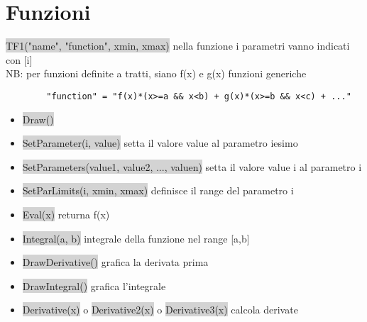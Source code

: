 \documentclass[a4paper]{article}
\begin{document}
\section{Funzioni}
    \colorbox{LightGray}{TF1("name", "function", xmin, xmax)} nella funzione i parametri vanno indicati con [i]\\
    NB: per funzioni definite a tratti, siano f(x) e g(x) funzioni generiche
    \begin{verbatim}
        "function" = "f(x)*(x>=a && x<b) + g(x)*(x>=b && x<c) + ..."
    \end{verbatim}
    \begin{itemize}
        \item \colorbox{LightGray}{Draw()}
        \item \colorbox{LightGray}{SetParameter(i, value)} setta il valore value al parametro iesimo
        \item \colorbox{LightGray}{SetParameters(value1, value2, ..., valuen)} setta il valore value i al parametro i
        \item \colorbox{LightGray}{SetParLimits(i, xmin, xmax)} definisce il range del parametro i
        \item \colorbox{LightGray}{Eval(x)} returna f(x)
        \item \colorbox{LightGray}{Integral(a, b)} integrale della funzione nel range [a,b]
        \item \colorbox{LightGray}{DrawDerivative()} grafica la derivata prima
        \item \colorbox{LightGray}{DrawIntegral()} grafica l’integrale
        \item \colorbox{LightGray}{Derivative(x)} o \colorbox{LightGray}{Derivative2(x)} o \colorbox{LightGray}{Derivative3(x)} calcola derivate
    \end{itemize}
\end{document}
